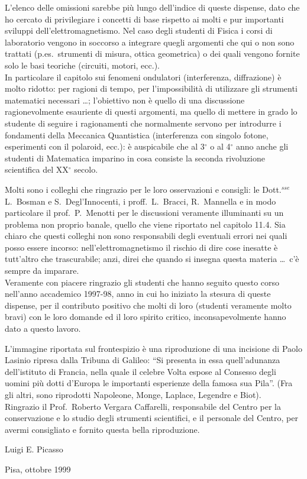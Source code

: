 L'elenco delle omissioni sarebbe pi\`u lungo dell'indice di queste dispense,
dato che ho cercato di privilegiare i concetti di base rispetto ai molti e pur
importanti sviluppi dell'elettromagnetismo. Nel caso degli studenti di Fisica i
corsi di laboratorio vengono in soccorso a integrare quegli argomenti che qui o
non sono trattati (p.es.\ strumenti di misura, ottica geometrica) o dei quali
vengono fornite solo le basi teoriche (circuiti, motori, ecc.).\\
In particolare il capitolo sui fenomeni ondulatori (interferenza, diffrazione)
\`e molto ridotto: per ragioni di tempo, per l'impossibilit\`a di utilizzare gli
strumenti matematici necessari \dots; l'obiettivo non \`e quello di una
discussione ragionevolmente esauriente di questi argomenti, ma quello di mettere
in grado lo studente di seguire i ragionamenti che normalmente servono per
introdurre i fondamenti della Meccanica Quantistica (interferenza con singolo
fotone, esperimenti con il polaroid, ecc.): \`e auspicabile che al 3$^\circ$ o
al 4$^\circ$ anno anche gli studenti di Matematica imparino in cosa consiste la
seconda rivoluzione scientifica del XX$^\circ$ secolo.

Molti sono i colleghi che ringrazio per le loro osservazioni e consigli: le
Dott.$^{\mathit{sse}}$ L.~Bosman e S.~Degl'Innocenti, i proff.\ L.~Bracci,
R.~Mannella e in modo particolare il prof.\ P.~Menotti per le discussioni
veramente illuminanti su un problema non proprio banale, quello che viene
riportato nel capitolo 11.4. Sia chiaro che questi colleghi non sono
responsabili degli eventuali errori nei quali posso essere incorso:
nell'elettromagnetismo il rischio di dire cose inesatte \`e tutt'altro che
trascurabile; anzi, direi che quando si insegna questa materia \dots\ c'\`e
sempre da imparare.\\
Veramente con piacere ringrazio gli studenti che hanno seguito questo corso
nell'anno accademico 1997-98, anno in cui ho iniziato la stesura di queste
dispense, per il contributo positivo che molti di loro (studenti veramente molto
bravi) con le loro domande ed il loro spirito critico, inconsapevolmente hanno
dato a questo lavoro.

L'immagine riportata sul frontespizio \`e una riproduzione di una incisione di
Paolo Lasinio ripresa dalla Tribuna di Galileo: ``Si presenta in essa
quell'adunanza dell'istituto di Francia, nella quale il celebre Volta espose al
Consesso degli uomini pi\`u dotti d'Europa le importanti esperienze della famosa
sua Pila''. (Fra gli altri, sono riprodotti Napoleone, Monge, Laplace, Legendre
e Biot).\\
Ringrazio il Prof.\ Roberto Vergara Caffarelli, responsabile del Centro per la
conservazione e lo studio degli strumenti scientifici, e il personale del
Centro, per avermi consigliato e fornito questa bella riproduzione.

\begin{flushright}
  Luigi E. Picasso
\end{flushright}

Pisa, ottobre 1999
\clearpage
